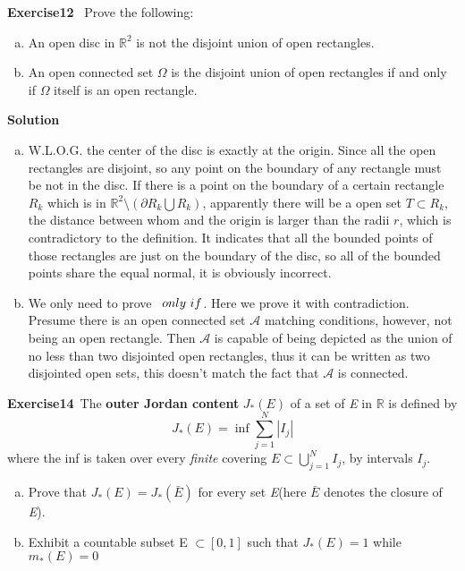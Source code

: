 \documentclass{article}
\begin{document}
\Large{\textbf{Exercise12}} \ Prove the following:
\begin{enumerate}[(a)]
	\item An open disc in $\mathbb{R}^2$  is not the disjoint union of open rectangles.
	\item An open connected set $\Omega$ is the disjoint union of open rectangles if and only if  $\Omega$  itself is an open rectangle.
\end{enumerate} 
\Large{\textbf{Solution}}\
	\begin{enumerate}[(a)]
		\item W.L.O.G. the center of the disc is exactly at the origin. Since all the open rectangles are disjoint, so any point on the boundary of any rectangle must be not in the disc. If there is a point on the boundary of a certain rectangle $R_k$ which is in $\mathbb{R}^2 \setminus (\partial R_k \bigcup R_k)$, apparently there will be a open set $T \subset R_k$, the distance between whom and the origin is larger than the radii $r$, which is contradictory to the definition. It indicates that all the bounded points of those rectangles are just on the boundary of the disc, so all of the bounded points share the equal normal, it is obviously incorrect.
		\item We only need to prove \ $\mathnormal{only\ if}$. Here we prove it with contradiction. Presume there is an open connected set $\mathcal{A}$ matching conditions, however, not being an open rectangle. Then $\mathcal{A}$ is capable of being depicted as the union of no less than two disjointed open rectangles, thus it can be written as two disjointed open sets, this doesn't match the fact that $\mathcal{A}$ is connected.   
	\end{enumerate}

\Large{\textbf{Exercise14}}\ The \textbf{outer Jordan content} $J_{*}(E)$ of a set of \emph{E} in $\mathbb{R}$ is defined by 
\[J_{*}(E) = \inf\sum^{N}_{j = 1}|I_j|\] 
where the inf is taken over every \emph{finite} covering $E\subset \bigcup^N_{j=1}I_j$, by intervals $I_j$.
\begin{enumerate}[(a)]
	\item Prove that $J_{*}(E) = J_{*}(\bar{E})$ for every set \emph{E}(here $\bar{E}$ denotes the closure of \emph{E}).
	\item Exhibit a countable subset E $\subset [0,1]$ such that $J_{*}(E) = 1$ while $m_{*}(E) = 0$ 
\end{enumerate}
\end{document}
